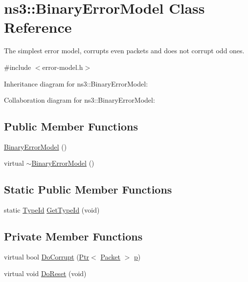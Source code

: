 \hypertarget{classns3_1_1BinaryErrorModel}{}\section{ns3\+:\+:Binary\+Error\+Model Class Reference}
\label{classns3_1_1BinaryErrorModel}


The simplest error model, corrupts even packets and does not corrupt odd ones.  




{\ttfamily \#include $<$error-\/model.\+h$>$}



Inheritance diagram for ns3\+:\+:Binary\+Error\+Model\+:


Collaboration diagram for ns3\+:\+:Binary\+Error\+Model\+:
\subsection*{Public Member Functions}
\begin{DoxyCompactItemize}
\item 
\hyperlink{classns3_1_1BinaryErrorModel_af3c6a6bb553dbdeb134e196209e667f5}{Binary\+Error\+Model} ()
\item 
virtual \hyperlink{classns3_1_1BinaryErrorModel_a603dd846273f8c38698c4de34bc76978}{$\sim$\+Binary\+Error\+Model} ()
\end{DoxyCompactItemize}
\subsection*{Static Public Member Functions}
\begin{DoxyCompactItemize}
\item 
static \hyperlink{classns3_1_1TypeId}{Type\+Id} \hyperlink{classns3_1_1BinaryErrorModel_a52263d5728f759cbe49ee3bb4c3ae967}{Get\+Type\+Id} (void)
\end{DoxyCompactItemize}
\subsection*{Private Member Functions}
\begin{DoxyCompactItemize}
\item 
virtual bool \hyperlink{classns3_1_1BinaryErrorModel_aeccdb04090dba5473bb0b0e58990e1d7}{Do\+Corrupt} (\hyperlink{classns3_1_1Ptr}{Ptr}$<$ \hyperlink{classns3_1_1Packet}{Packet} $>$ \hyperlink{lte__link__budget__x2__handover__measures_8m_ac9de518908a968428863f829398a4e62}{p})
\item 
virtual void \hyperlink{classns3_1_1BinaryErrorModel_a9eff16de05702e0a7c43a603b22a99f2}{Do\+Reset} (void)
\end{DoxyCompactItemize}
